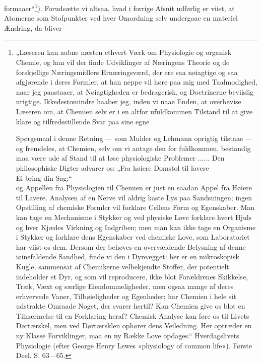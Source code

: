 \documentclass[12pt,a4paper]{book}
\begin{document}
formaaer“\footnote{„Læseren kan aabne næsten ethvert Værk om
Physiologie og organisk Chemie, og han vil der finde Udviklinger af
Næringens Theorie og de forskjellige Næringsmidlers
Ernæringsværd, der ere saa nøiagtige og saa afgjørende i deres
Formler, at han neppe vil høre paa mig med Taalmodighed, naar jeg
paastaaer, at Nøiagtigheden er bedragerisk, og Doctrinerne
beviislig urigtige. Ikkedestomindre haaber jeg, inden vi naae
Enden, at overbevise Læseren om, at Chemien selv er i en altfor
ufuldkommen Tilstand til at give klare og tilfredsstillende Svar
paa sine egne
\par Spørgsmaal i denne Retning --- som Mulder og Lehmann oprigtig
tilstaae --- og fremdeles, at Chemien, selv om vi antage den for
fuldkommen, bestandig maa være ude af Stand til at løse
physiologiske Problemer ...... Den philosophiske Digter advarer
os: „Fra høiere Domstol til lavere\\
Ei bring din Sag;“\\
og Appellen fra Physiologien til Chemien er just en saadan Appel
fra Høiere til Lavere. Analysen af en Nerve vil aldrig kaste Lys
paa Sandsningen; ingen Opstilling af chemiske Formler vil forklare
Cellens Form og Egenskaber. Man kan tage en Mechanisme i Stykker og
ved physiske Love forklare hvert Hjuls og hver Kjædes Virkning og
Indgriben; men man kan ikke tage en Organisme i Stykker og forklare
dens Egenskaber ved chemiske Love, som Laboratoriet har viist os
dem. Dersom der behøves en overvældende Belysning af denne
iøinefaldende Sandhed, finde vi den i Dyreægget: her er en
mikroskopisk Kugle, sammensat af Chemikerne velbekjendte Stoffer,
der potentielt indeholder et Dyr, og som vil reproducere, ikke blot
Forældrenes Skikkelse, Træk, Væxt og særlige Eiendommeligheder,
men ogsaa mange af deres erhvervede Vaner, Tilbøieligheder og
Egenheder; har Chemien i hele sit udstrakte Omraade Noget, der
svarer hertil? Kan Chemien give os blot en Tilnærmelse til en
Forklaring heraf? Chemisk Analyse kan føre os til Livets
Dørtærskel, men ved Dørtærsklen ophører dens Veiledning. Her
optræder en ny Klasse Forviklinger, maa en ny Række Love
opdages.“ Hverdagslivets Physiologie (efter George Henry Lewes
»physiology of common life«). Første Deel. S. 63---65.}). Forudsætte
vi altsaa, hvad i forrige
\setcounter{footnote}{0}
Afsnit udførlig er viist, at Atomerne som Stofpunkter ved hver
Omordning selv undergaae en materiel Ændring, da bliver
\end{document}
